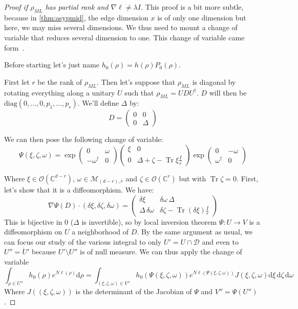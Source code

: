 \documentclass[10pt,a4paper]{report}
\theoremstyle{plain}
\theoremstyle{definition}
\theoremstyle{remark}
\newcommand{\C}{\ensuremath{\mathbb{C}}}
\newcommand{\dd}{\mathrm{d}}
\newcommand{\mat}[1]{\begin{pmatrix}#1\end{pmatrix}}
\DeclareMathOperator{\Tr}{Tr}
\newcommand{\ml}{_{M\!L}}
\begin{document}
\begin{proof}[Proof if $\rho\ml$ has partial rank and $\nabla \ell \neq \lambda I$]
  This proof is a bit more subtle, because in \cref{thm:asypmid}, the edge
  dimension $x$ is of only one dimension but here, we may miss several
  dimensions. We thus need to mount a change of variable that reduces several
  dimension to one. This change of variable came form~\cite{SPRAL17}.

  Before starting let's just name $h_0(\rho) = h(\rho)P_0(\rho)$.

  First let $r$ be the rank of $\rho\ml$. Then let's suppose that $\rho\ml$ is
  diagonal by rotating everything along a unitary $U$ such that $\rho\ml = U
  DU^\dagger$. $D$ will then be $\mathrm{diag}(0,\ldots,0,p_1,\ldots,p_r)$.
  We'll define $\Delta$ by:
  \[ D = \mat{0 & 0\\0&\Delta}\]

  We can then
  pose the following change of variable:
  \begin{equation}
  \Psi(\xi,\zeta,\omega) = \exp\mat{0 &\omega\\-\omega^\dagger&0}
    \mat{\xi&0\\0&\Delta + \zeta - \Tr \xi \frac{I}r} \exp\mat{0 &-\omega\\\omega^\dagger&0}
  \end{equation}

  Where $\xi \in \mathcal{O}(\C^{d-r})$, $\omega \in \mathcal{M}_{(d-r),r}$ and
  $\zeta \in \mathcal{O}(\C^r)$ but with $\Tr \zeta = 0$. First, let's show that
  it is a diffeomorphism. We have:
  \begin{equation}
    \nabla \Psi(D) \cdot (\delta\xi,\delta\zeta, \delta\omega) =
    \mat{\delta\xi& \delta\omega\,\Delta\\ \Delta\, \delta\omega & \delta\zeta -
      \Tr(\delta\xi)\frac Ir}
  \end{equation}
  This is bijective in 0 ($\Delta$ is invertible), so by local inversion theorem
  $\Psi : U \to V$ is a diffeomorphism on $U$ a neighborhood of $D$. By the
  same argument as usual, we can focus our study of the various integral to only
  $U' = U \cap \mathcal{D}$ and even to $U'' = \mathring U'$ because $U'
  \setminus U''$ is of null measure. We can thus apply the change of variable
  \newcommand{\vars}{(\xi,\zeta,\omega)}
  \newcommand{\dvars}{\dd \xi\, \dd \zeta\, \dd \omega\,}
  \newcommand{\pvars}{\Psi(\xi,\zeta,\omega)}
  \begin{equation}\label{eqn:uglyint}
    \int_{\rho \in U''} h_0(\rho)e^{N\ell(\rho)}\dd \rho =
    \int_{\vars \in V''} h_0(\pvars)e^{N\ell(\pvars)}J\vars \dvars
  \end{equation}
  Where $J(\vars)$ is the determinant of the Jacobian of $\Psi$ and $V'' = \Psi(U'')$.


\end{proof}
\end{document}
